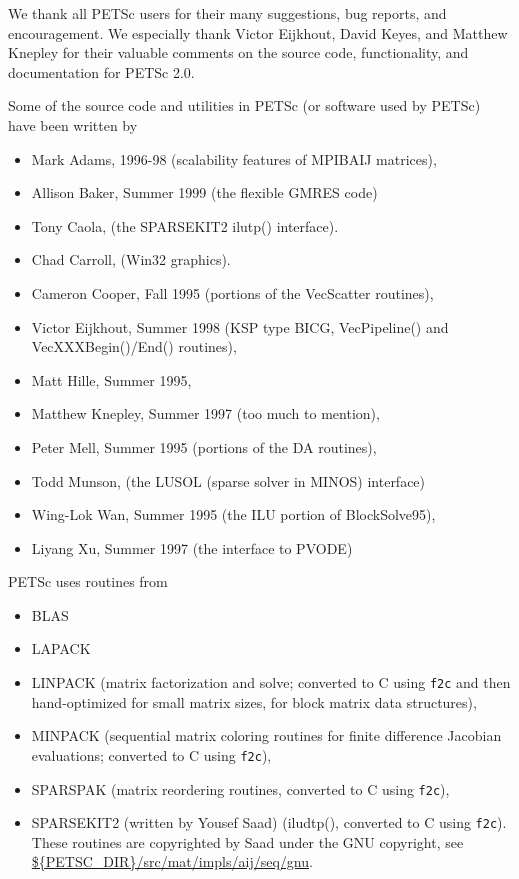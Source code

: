 %
%

\medskip \medskip \noindent
We thank all PETSc users for their many suggestions, bug reports, and
encouragement.  We especially thank Victor Eijkhout, David Keyes, and
Matthew Knepley for their valuable comments on the source code,
functionality, and documentation for PETSc 2.0.


\vspace{.3in}
\noindent
Some of the source code and utilities in PETSc (or software used by PETSc)
have been written by 
\begin{itemize}
  \item Mark Adams, 1996-98 (scalability features of MPIBAIJ matrices),
  \item Allison Baker, Summer 1999 (the flexible GMRES code)
  \item Tony Caola, (the SPARSEKIT2 ilutp() interface).
  \item Chad Carroll, (Win32 graphics).
  \item Cameron Cooper, Fall 1995 (portions of the VecScatter routines), 
  \item Victor Eijkhout, Summer 1998 (KSP type BICG, VecPipeline() and VecXXXBegin()/End() routines), 
  \item Matt Hille, Summer 1995,
  \item Matthew Knepley, Summer 1997 (too much to mention),
  \item Peter Mell, Summer 1995 (portions of the DA routines),
  \item Todd Munson, (the LUSOL (sparse solver in MINOS) interface)
  \item Wing-Lok Wan, Summer 1995 (the ILU portion of BlockSolve95),
  \item Liyang Xu, Summer 1997 (the interface to PVODE)
\end{itemize}

\vspace{.3in}
\noindent
PETSc uses routines from 
\begin{itemize}
  \item BLAS
  \item LAPACK
  \item LINPACK      (matrix factorization and solve; converted to C using {\tt f2c} and then 
                      hand-optimized for small matrix sizes, for block matrix data structures),
  \item MINPACK      (sequential matrix coloring routines for finite difference Jacobian
                       evaluations; converted to C using {\tt f2c}),
  \item SPARSPAK     (matrix reordering routines, converted to C using {\tt f2c}),
  \item SPARSEKIT2 (written by Yousef Saad) (iludtp(), converted to C using {\tt f2c}). These routines 
                     are copyrighted by Saad under the GNU copyright, see \url{${PETSC_DIR}/src/mat/impls/aij/seq/gnu}.
\end{itemize}


